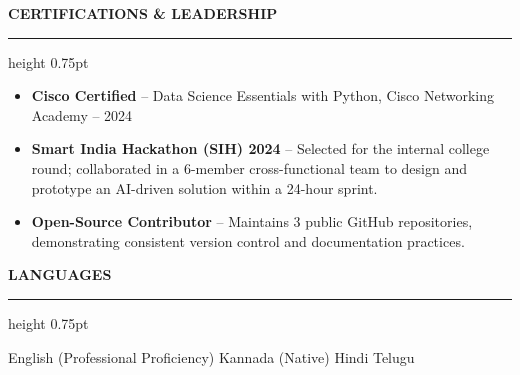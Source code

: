 \documentclass[10pt,a4paper]{article}
\newcommand{\resumesection}[1]{%
  \vspace{14pt}%
  {\large\textbf{\color{primary}#1}}\par\vspace{3pt}%
  {\color{primary}\hrule height 0.75pt}\vspace{7pt}%
}
\begin{document}
\resumesection{CERTIFICATIONS \& LEADERSHIP}
\begin{itemize}
    \item \textbf{Cisco Certified} -- Data Science Essentials with Python, Cisco Networking Academy -- 2024
    \item \textbf{Smart India Hackathon (SIH) 2024} -- Selected for the internal college round; collaborated in a 6-member cross-functional team to design and prototype an AI-driven solution within a 24-hour sprint.
    \item \textbf{Open-Source Contributor} -- Maintains 3 public GitHub repositories, demonstrating consistent version control and documentation practices.
\end{itemize}

\resumesection{LANGUAGES}
\noindent English (Professional Proficiency) \enspace\textbullet\enspace Kannada (Native) \enspace\textbullet\enspace Hindi \enspace\textbullet\enspace Telugu
\end{document}
